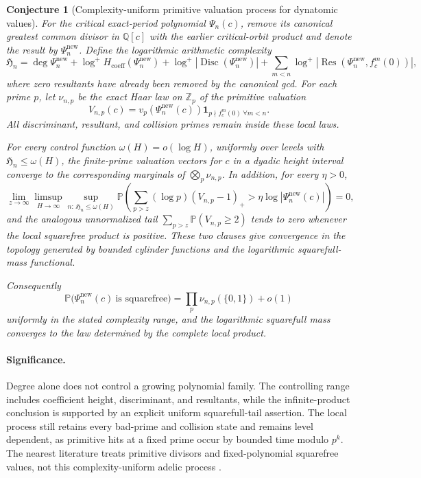 \documentclass[11pt]{article}
\newtheorem{conjecture}{Conjecture}
\newcommand{\Pp}{\mathbb P}
\newcommand{\Z}{\mathbb Z}
\newcommand{\Q}{\mathbb Q}
\begin{document}
\begin{conjecture}[Complexity-uniform primitive valuation process for dynatomic values]\label{c19}
For the critical exact-period polynomial $\Psi_n(c)$, remove its canonical greatest
common divisor in $\Q[c]$ with the earlier critical-orbit product and denote the result
by $\Psi_n^{\mathrm{new}}$.  Define the logarithmic arithmetic complexity
\[
 \mathfrak H_n=
 \deg\Psi_n^{\mathrm{new}}
 +\log^+H_{\mathrm{coeff}}(\Psi_n^{\mathrm{new}})
 +\log^+|\operatorname{Disc}(\Psi_n^{\mathrm{new}})|
 +\sum_{m<n}\log^+|\operatorname{Res}(\Psi_n^{\mathrm{new}},f_c^m(0))|,
\]
where zero resultants have already been removed by the canonical gcd.  For each prime
$p$, let $\nu_{n,p}$ be the exact Haar law on $\Z_p$ of the primitive valuation
\[
 V_{n,p}(c)=v_p(\Psi_n^{\mathrm{new}}(c))
 \mathbf 1_{p\nmid f_c^m(0)\ \forall m<n}.
\]
All discriminant, resultant, and collision primes remain inside these local laws.

For every control function $\omega(H)=o(\log H)$, uniformly over levels with
$\mathfrak H_n\le\omega(H)$, the finite-prime valuation vectors for $c$ in a dyadic
height interval converge to the corresponding marginals of
$\bigotimes_p\nu_{n,p}$.  In addition, for every $\eta>0$,
\[
 \lim_{z\to\infty}\limsup_{H\to\infty}
 \sup_{n:\,\mathfrak H_n\le\omega(H)}
 \Pp\!\left(
   \sum_{p>z}(\log p)(V_{n,p}-1)_+>
   \eta\log|\Psi_n^{\mathrm{new}}(c)|
 \right)=0,
\]
and the analogous unnormalized tail
$\sum_{p>z}\Pp(V_{n,p}\ge2)$ tends to zero whenever the local squarefree product is
positive.  These two clauses give convergence in the topology generated by bounded
cylinder functions and the logarithmic squarefull-mass functional.

Consequently
\[
 \Pp\bigl(\Psi_n^{\mathrm{new}}(c)\ \text{is squarefree}\bigr)
 =\prod_p\nu_{n,p}(\{0,1\})+o(1)
\]
uniformly in the stated complexity range, and the logarithmic squarefull mass converges
to the law determined by the complete local product.
\end{conjecture}

\paragraph{Significance.}
Degree alone does not control a growing polynomial family.  The controlling range includes
coefficient height, discriminant, and resultants, while the infinite-product conclusion
is supported by an explicit uniform squarefull-tail assertion.  The local process still
retains every bad-prime and collision state and remains level dependent, as primitive
hits at a fixed prime occur by bounded time modulo $p^k$.  The nearest literature treats
primitive divisors and fixed-polynomial squarefree values, not this complexity-uniform
adelic process \cite{Primitive,KrummDynatomic}.
\end{document}
